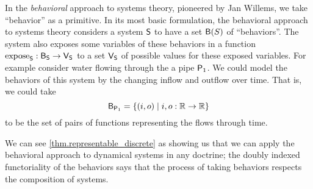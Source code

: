 \documentclass[DynamicalBook]{subfiles}
\begin{document}
In the \emph{behavioral} approach to systems theory, pioneered by Jan Willems,
we take ``behavior'' as a primitive. In its most basic formulation, the behavioral
approach to systems theory considers a system $\mathsf{S}$ to have a set
$\mathsf{B}(S)$ of ``behaviors''. The system also exposes some variables of these
behaviors in a function $\mathrm{expose}_{\mathsf{S}} : \mathsf{B}_{\mathsf{S}} \to \mathsf{V}_{\mathsf{S}}$
to a set
$\mathsf{V}_{\mathsf{S}}$ of possible values for these exposed variables. For example
consider water flowing through the a pipe $\mathsf{P}_1$. We could model the
behaviors of this system by the changing inflow and outflow over time. That is,
we could take
\[
\mathsf{B}_{\mathsf{P}_1} = \{(i, o) \mid i, o: \mathbb{R} \to \mathbb{R}\}
\]
to be the set of pairs of functions representing the flows through time.




We can see \cref{thm.representable_discrete} as
showing us that we can apply the behavioral approach to dynamical systems in any
doctrine; the doubly indexed functoriality of the behaviors says that the
process of taking behaviors respects the composition of systems.
\end{document}
